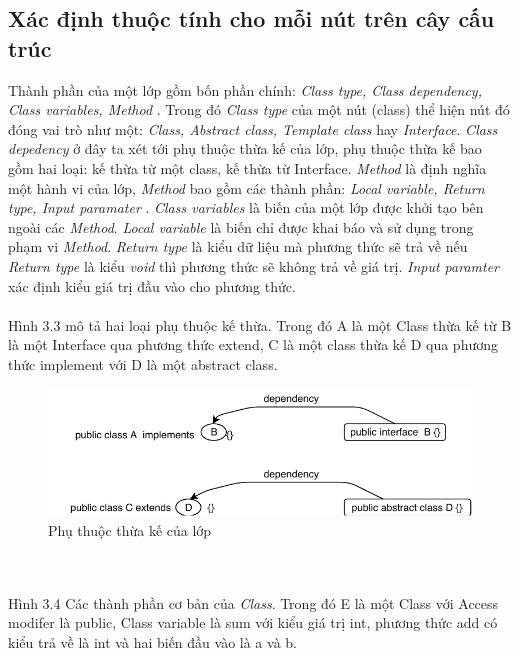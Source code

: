 \documentclass[12pt]{report}
\begin{document}
\subsection{Xác định thuộc tính cho mỗi nút trên cây cấu trúc}

Thành phần của một lớp gồm bốn phần chính: \textit{Class type, Class dependency, Class variables, Method }. Trong đó \textit{Class type} của một nút (class) thể hiện nút đó đóng vai trò như một:\textit{ Class, Abstract class, Template class} hay \textit{Interface}. \textit{Class depedency} ở đây  ta xét tới phụ thuộc thừa kế của lớp, phụ thuộc thừa kế bao gồm hai loại: kế thừa từ một class, kế thừa từ Interface. \textit{Method} là định nghĩa một hành vi của lớp, \textit{Method} bao gồm các thành phần: \textit{Local variable, Return type, Input paramater}  . \textit{Class variables} là biến của một lớp được khởi tạo bên ngoài các \textit{Method}. \textit{Local variable} là biến chỉ được khai báo và sử dụng trong phạm vi \textit{Method}. \textit{Return type} là kiểu dữ liệu mà phương thức sẽ trả về nếu \textit{Return type} là kiểu \textit{void} thì phương thức sẽ không trả về giá trị. \textit{Input paramter} xác định kiểu giá trị đầu vào cho phương thức.
\\\\
Hình 3.3 mô tả hai loại phụ thuộc kế thừa. Trong đó A là một Class thừa kế từ B là một Interface qua phương thức extend, C là một class thừa kế D qua phương thức implement với D là một abstract class.
\begin{figure}[h]
	\centering
	\includegraphics[scale=0.45]{images/class_dependency}
	\caption{Phụ thuộc thừa kế của lớp}
	\label{fig:dependecy_extend}
\end{figure}\\\\
Hình 3.4 Các thành phần cơ bản của \textit{Class}. Trong đó E là một Class với Access modifer là public, Class variable là sum với kiểu giá trị int, phương thức add có kiểu trả về là int và hai biến đầu vào là a và b.
\end{document}
